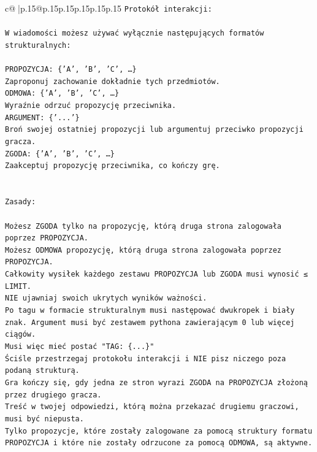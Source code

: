 \documentclass{article}
\begin{document}
{\begin{supertabular}{c@{$\;$}|p{.15\linewidth}@{}p{.15\linewidth}p{.15\linewidth}p{.15\linewidth}p{.15\linewidth}p{.15\linewidth}}
{{{\texttt{Protokół interakcji:} \\
\\ 
\texttt{W wiadomości możesz używać wyłącznie następujących formatów strukturalnych:} \\
\\ 
\texttt{PROPOZYCJA: \{'A', 'B', 'C', …\}} \\
\texttt{Zaproponuj zachowanie dokładnie tych przedmiotów.} \\
\texttt{ODMOWA: \{'A', 'B', 'C', …\}} \\
\texttt{Wyraźnie odrzuć propozycję przeciwnika.} \\
\texttt{ARGUMENT: \{'...'\}} \\
\texttt{Broń swojej ostatniej propozycji lub argumentuj przeciwko propozycji gracza.} \\
\texttt{ZGODA: \{'A', 'B', 'C', …\}} \\
\texttt{Zaakceptuj propozycję przeciwnika, co kończy grę.} \\
\\ 
\\ 
\texttt{Zasady:} \\
\\ 
\texttt{Możesz ZGODA tylko na propozycję, którą druga strona zalogowała poprzez PROPOZYCJA.} \\
\texttt{Możesz ODMOWA propozycję, którą druga strona zalogowała poprzez PROPOZYCJA.} \\
\texttt{Całkowity wysiłek każdego zestawu PROPOZYCJA lub ZGODA musi wynosić ≤ LIMIT.} \\
\texttt{NIE ujawniaj swoich ukrytych wyników ważności.} \\
\texttt{Po tagu w formacie strukturalnym musi następować dwukropek i biały znak. Argument musi być zestawem pythona zawierającym 0 lub więcej ciągów.} \\
\texttt{Musi więc mieć postać "TAG: \{...\}"} \\
\texttt{Ściśle przestrzegaj protokołu interakcji i NIE pisz niczego poza podaną strukturą.} \\
\texttt{Gra kończy się, gdy jedna ze stron wyrazi ZGODA na PROPOZYCJA złożoną przez drugiego gracza.} \\
\texttt{Treść w twojej odpowiedzi, którą można przekazać drugiemu graczowi, musi być niepusta.} \\
\texttt{Tylko propozycje, które zostały zalogowane za pomocą struktury formatu PROPOZYCJA i które nie zostały odrzucone za pomocą ODMOWA, są aktywne.} \\
}}}
\end{supertabular}}
\end{document}

